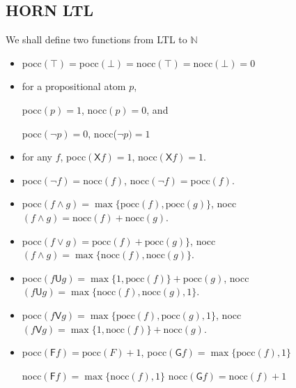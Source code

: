 \documentclass[12pt]{article}
\begin{document}
\begin{CJK*}{GBK}{song}
\section{HORN LTL}

We shall define two functions from LTL to $\mathbb{N}$
\begin{itemize}

\item pocc$(\top)=$pocc$(\bot)=$nocc$(\top)=$nocc$(\bot)=0$

\item for a propositional atom $p$,

pocc$(p)=1$, nocc$(p)=0$, and

pocc$(\neg p)=0$, nocc($\neg p)=1$

\item for any $f$, pocc$(\textsf{X}f)=1$, nocc$(\textsf{X}f)=1$.


\item pocc$(\neg f)=$nocc$(f)$, nocc$(\neg f)=$pocc$(f)$.


\item pocc$(f\wedge g)=\max\{\mbox{pocc}(f), \mbox{pocc}(g)\}$, nocc$(f\wedge g)=\mbox{nocc}(f)+\mbox{nocc}(g)$.

\item pocc$(f\vee g)=\mbox{pocc}(f)+\mbox{pocc}(g)\}$, nocc$(f\wedge g)=\max\{\mbox{nocc}(f), \mbox{nocc}(g)\}$.

\item pocc$(f\textsf{U}g)=\max\{1,\mbox{pocc}(f)\}+\mbox{pocc}(g)$, nocc$(f\textsf{U} g)=\max\{\mbox{nocc}(f),\mbox{nocc}(g),1\}$.

\item pocc$(f\textsf{V}g)=\max\{\mbox{pocc}(f), \mbox{pocc}(g),1\}$, nocc$(f\textsf{V} g)=\max\{1,\mbox{nocc}(f)\}+\mbox{nocc}(g)$.

\item pocc$(\textsf{F} f)=\mbox{pocc}(F)+1$, \mbox{pocc}$(\textsf{G}f)=\max\{\mbox{pocc}(f),1\}$

nocc$(\textsf{F}f)=\max\{\mbox{nocc}(f),1\}$   \mbox{nocc}$(\textsf{G}f)=\mbox{nocc}(f)+1$

\end{itemize}





\end{CJK*}
\end{document}
